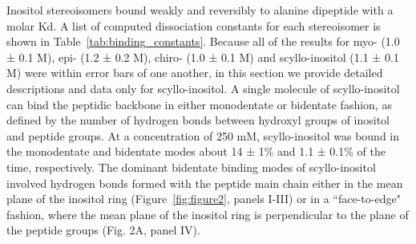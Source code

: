 	Inositol stereoisomers bound weakly and reversibly to alanine dipeptide with a molar Kd. A list of computed dissociation constants for each stereoisomer is shown in Table~\ref{tab:binding_constants}. Because all of the results for myo- (1.0 ± 0.1 M), epi- (1.2 ± 0.2 M), chiro- (1.0 ± 0.1 M) and scyllo-inositol (1.1 ± 0.1 M) were within error bars of one another, in this section we provide detailed descriptions and data only for scyllo-inositol. A single molecule of scyllo-inositol can bind the peptidic backbone in either monodentate or bidentate fashion, as defined by the number of hydrogen bonds between hydroxyl groups of inositol and peptide groups. At a concentration of 250 mM, scyllo-inositol was bound in the monodentate and bidentate modes about 14 ± 1\% and 1.1 ± 0.1\% of the time, respectively. The dominant bidentate binding modes of scyllo-inositol involved hydrogen bonds formed with the peptide main chain either in the mean plane of the inositol ring (Figure~\ref{fig:figure2}, panels I-III) or in a ``face-to-edge" fashion, where the mean plane of the inositol ring is perpendicular to the plane of the peptide groups (Fig. 2A, panel IV).
	
